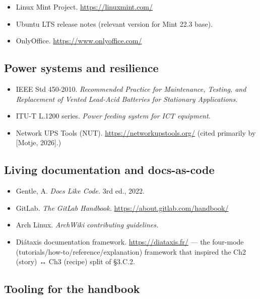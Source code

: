 \begin{itemize}
\tightlist
\item
  Linux Mint Project. \url{https://linuxmint.com/}
\item
  Ubuntu LTS release notes (relevant version for Mint 22.3 base).
\item
  OnlyOffice. \url{https://www.onlyoffice.com/}
\end{itemize}

\hypertarget{power-systems-and-resilience}{%
\subsection{Power systems and
resilience}\label{power-systems-and-resilience}}

\begin{itemize}
\tightlist
\item
  IEEE Std 450-2010. \emph{Recommended Practice for Maintenance,
  Testing, and Replacement of Vented Lead-Acid Batteries for Stationary
  Applications.}
\item
  ITU-T L.1200 series. \emph{Power feeding system for ICT equipment.}
\item
  Network UPS Tools (NUT). \url{https://networkupstools.org/} (cited
  primarily by {[}Motje, 2026{]}.)
\end{itemize}

\hypertarget{living-documentation-and-docs-as-code}{%
\subsection{Living documentation and
docs-as-code}\label{living-documentation-and-docs-as-code}}

\begin{itemize}
\tightlist
\item
  Gentle, A. \emph{Docs Like Code.} 3rd ed., 2022.
\item
  GitLab. \emph{The GitLab Handbook.}
  \url{https://about.gitlab.com/handbook/}
\item
  Arch Linux. \emph{ArchWiki contributing guidelines.}
\item
  Diátaxis documentation framework. \url{https://diataxis.fr/} --- the
  four-mode (tutorials/how-to/reference/explanation) framework that
  inspired the Ch2 (story) ↔ Ch3 (recipe) split of §3.C.2.
\end{itemize}

\hypertarget{tooling-for-the-handbook}{%
\subsection{Tooling for the handbook}\label{tooling-for-the-handbook}}

